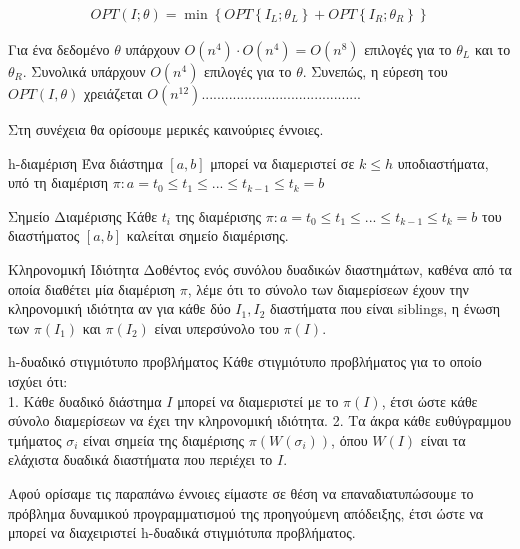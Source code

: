 \documentclass[oneside,12pt]{book}
\theoremstyle{definition}
\begin{document}
\begin{align*}
	OPT(I;θ) = \min \left\{ OPT\left\{ I_L;θ_L \right\} + OPT\left\{ I_R;θ_R \right\} \right\}
\end{align*}

Για ένα δεδομένο \(θ\) υπάρχουν \(O(n^4) \cdot O(n^4) = O(n^8)\) επιλογές για το \(θ_L\) και το \(θ_R\). Συνολικά υπάρχουν \(O(n^4)\) επιλογές για το \(θ\). Συνεπώς, η εύρεση του \(OPT(I,θ)\) χρειάζεται \(Ο(n^{12})\).........................................

Στη συνέχεια θα ορίσουμε μερικές καινούριες έννοιες. \\

\begin{mydefinition}{h-διαμέριση}{}
	Ένα διάστημα \([a,b]\) μπορεί να διαμεριστεί σε \(k \leq h\) υποδιαστήματα, υπό τη διαμέριση \(π: a = t_0 \leq t_1 \leq ... \leq t_{k-1} \leq t_k = b\)
\end{mydefinition}

\begin{mydefinition}{Σημείο Διαμέρισης}{}
	Κάθε \(t_i\) της διαμέρισης \(π: a = t_0 \leq t_1 \leq ... \leq t_{k-1} \leq t_k = b\) του διαστήματος \([a,b]\) καλείται σημείο διαμέρισης.
\end{mydefinition}

\begin{mydefinition}{Κληρονομική Ιδιότητα}{}
	Δοθέντος ενός συνόλου δυαδικών διαστημάτων, καθένα από τα οποία διαθέτει μία διαμέριση \(π\), λέμε ότι το σύνολο των διαμερίσεων έχουν την κληρονομική ιδιότητα αν για κάθε δύο \(I_1, I_2\) διαστήματα που είναι siblings, η ένωση των \(π(I_1)\) και \(π(I_2)\) είναι υπερσύνολο του \(π(Ι)\). 
\end{mydefinition}

\begin{mydefinition}{h-δυαδικό στιγμιότυπο προβλήματος}{}
	Κάθε στιγμιότυπο προβλήματος για το οποίο ισχύει ότι: \\
	1. Κάθε δυαδικό διάστημα \(I\) μπορεί να διαμεριστεί με το \(π(Ι)\), έτσι ώστε κάθε σύνολο διαμερίσεων να έχει την κληρονομική ιδιότητα.
	2. Τα άκρα κάθε ευθύγραμμου τμήματος \(σ_i\) είναι σημεία της διαμέρισης \(π(W(σ_i))\), όπου \(W(I)\) είναι τα ελάχιστα δυαδικά διαστήματα που περιέχει το \(I\). 
\end{mydefinition}

Αφού ορίσαμε τις παραπάνω έννοιες είμαστε σε θέση να επαναδιατυπώσουμε το πρόβλημα δυναμικού προγραμματισμού της προηγούμενη απόδειξης, έτσι ώστε να μπορεί να διαχειριστεί h-δυαδικά στιγμιότυπα προβλήματος. \\
\end{document}
